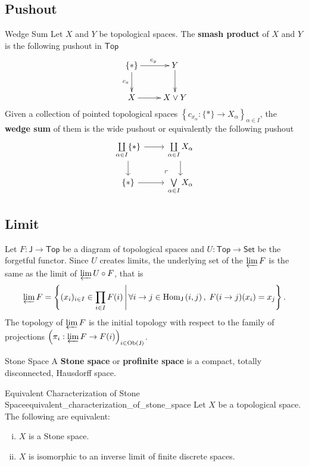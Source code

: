 \documentclass{report}
\newcommand{\midv}{\,\middle\vert\,}
\newcommand{\Top}{\mathsf{Top}}
\begin{document}
\subsection{Pushout}


\begin{definition}{Wedge Sum}{}
	Let $X$ and $Y$ be topological spaces. The \textbf{smash product} of $X$ and $Y$ is the following pushout in $\Top$
	\[\xymatrix{
			\{*\}\ar[r]^{c_y}\ar[d]_{c_x}  &Y\ar[d]_{}\\
			X\ar@{->}[r]_{}&X\vee Y
		}\]
	Given a collection of pointed topological spaces $\left\{c_{x_\alpha}:\{*\}\to X_\alpha\right\}_{\alpha\in I}$, the \textbf{wedge sum} of them is the wide pushout or equivalently the following pushout
	\[
		\begin{tikzcd}[ampersand replacement=\&]
			\coprod\limits_{\alpha\in I} \{*\} \arrow[r] \arrow[d] \& \coprod\limits_{\alpha\in I} X_{\alpha} \arrow[d] \\
			\{*\} \arrow[r] \& \bigvee\limits_{\alpha\in I} X_\alpha \arrow[ul, phantom, "\ulcorner", very near start]
		\end{tikzcd}
	\]
\end{definition}

\subsection{Limit}
\begin{definition}{}{}
	Let $F:\mathsf{J}\to \Top$ be a diagram of topological spaces and $U:\Top\to \mathsf{Set}$ be the forgetful functor. Since $U$ creates limits, the underlying set of the $\varprojlim F$ is the same as the limit of $\varprojlim U\circ F$, that is
	\[
		\varprojlim F=\left\{(x_i)_{i\in I}\in \prod_{i\in I}F(i)\midv \forall i\to j\in\mathrm{Hom}_{\mathsf{J}}\left(i,j\right),\; F(i\to j)(x_i)=x_j\right\}.
	\]
	The topology of $\varprojlim F$ is the initial topology with respect to the family of projections $\left(\pi_i:\varprojlim F\to F(i)\right)_{i\in \mathrm{Ob}(\mathsf{J})}$.
\end{definition}

\begin{definition}{Stone Space}{}
A \textbf{Stone space} or \textbf{profinite space} is a compact, totally disconnected, Hausdorff space.
\end{definition}

\begin{proposition}{Equivalent Characterization of Stone Space}{equivalent_characterization_of_stone_space}
	Let $X$ be a topological space. The following are equivalent:
	\begin{enumerate}[(i)]
		\item $X$ is a Stone space.
		\item $X$ is isomorphic to an inverse limit of finite discrete spaces.
	\end{enumerate}
\end{proposition}
\end{document}
